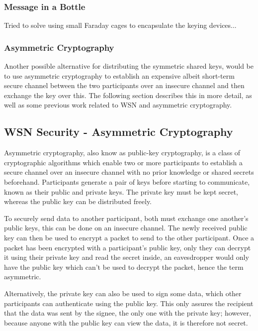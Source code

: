 \documentclass{mprop}
\begin{document}
\subsubsection{Message in a Bottle} %
\label{ssub:message_in_a_bottle}
Tried to solve using small Faraday cages to encapsulate the keying devices...\cite{MessageBottle}
\subsubsection{Asymmetric Cryptography} %
\label{ssub:asymmetric_cryptography}
Another possible alternative for distributing the symmetric shared keys, would be to use asymmetric cryptography to establish an expensive albeit short-term secure channel between the two participants over an insecure channel and then exchange the key over this. The following section describes this in more detail, as well as some previous work related to WSN and asymmetric cryptography.

\subsection{WSN Security - Asymmetric Cryptography} %
\label{sub:asymmetric_security}
Asymmetric cryptography, also know as public-key cryptography, is a class of cryptographic algorithms which enable two or more participants to establish a secure channel over an insecure channel with no prior knowledge or shared secrets beforehand. Participants generate a pair of keys before starting to communicate, known as their public and private keys. The private key must be kept secret, whereas the public key can be distributed freely. 

To securely send data to another participant, both must exchange one another's public keys, this can be done on an insecure channel. The newly received public key can then be used to encrypt a packet to send to the other participant. Once a packet has been encrypted with a participant's public key, only they can decrypt it using their private key and read the secret inside, an eavesdropper would only have the public key which can't be used to decrypt the packet, hence the term asymmetric. 

Alternatively, the private key can also be used to sign some data, which other participants can authenticate using the public key. This only assures the recipient that the data was sent by the signee, the only one with the private key; however, because anyone with the public key can view the data, it is therefore not secret.
\end{document}
